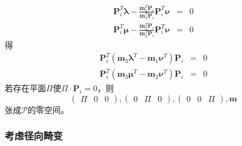 \documentclass{beamer}
\newcommand{\cdummy}{\cdot}
\newcommand{\tmmathbf}[1]{\ensuremath{\boldsymbol{#1}}}
\begin{document}
{{\begin{frame}
  \begin{eqnarray*}
    \tmmathbf{P}^T_i \tmmathbf{\lambda}- \frac{\tmmathbf{m}_1^T
    \tmmathbf{P}_i}{\tmmathbf{m}^T_3 \tmmathbf{P}_i} \tmmathbf{P}^T_i
    \tmmathbf{\nu} & = & 0\\
    \tmmathbf{P}^T_i \tmmathbf{\mu}- \frac{\tmmathbf{m}_2^T
    \tmmathbf{P}_i}{\tmmathbf{m}^T_3 \tmmathbf{P}_i} \tmmathbf{P}^T_i
    \tmmathbf{\nu} & = & 0
  \end{eqnarray*}
  得
  \begin{eqnarray*}
    \tmmathbf{P}^T_i (\tmmathbf{m}_3 \tmmathbf{\lambda}^T -\tmmathbf{m}_1
    \tmmathbf{\nu}^T) \tmmathbf{P}_i & = & 0\\
    \tmmathbf{P}^T_i (\tmmathbf{m}_3 \tmmathbf{\mu}^T -\tmmathbf{m}_2
    \tmmathbf{\nu}^T) \tmmathbf{P}_i & = & 0
  \end{eqnarray*}
  若存在平面$\Pi$使$\Pi \cdummy \tmmathbf{P}_i = 0$，则
  \[ \left(\begin{array}{ccc}
       \Pi & 0 & 0
     \end{array}\right), \left(\begin{array}{ccc}
       0 & \Pi & 0
     \end{array}\right), \left(\begin{array}{ccc}
       0 & 0 & \Pi
     \end{array}\right), \tmmathbf{m} \]
  张成$\mathcal{P}$的零空间。
\end{frame}}{\begin{frame}
  \frametitle{考虑径向畸变}
  

\end{frame}}}
\end{document}
